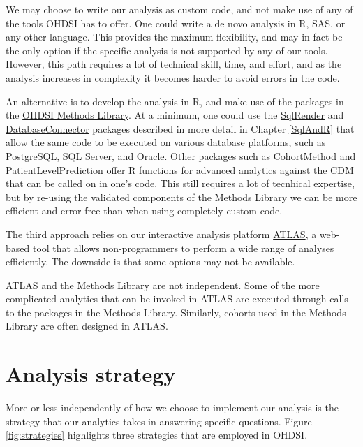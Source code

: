 \documentclass[11pt]{book}
\begin{document}
We may choose to write our analysis as custom code, and not make use of
any of the tools OHDSI has to offer. One could write a de novo analysis
in R, SAS, or any other language. This provides the maximum flexibility,
and may in fact be the only option if the specific analysis is not
supported by any of our tools. However, this path requires a lot of
technical skill, time, and effort, and as the analysis increases in
complexity it becomes harder to avoid errors in the code.

An alternative is to develop the analysis in R, and make use of the
packages in the \href{https://ohdsi.github.io/MethodsLibrary/}{OHDSI
Methods Library}. At a minimum, one could use the
\href{https://ohdsi.github.io/SqlRender/}{SqlRender} and
\href{https://ohdsi.github.io/DatabaseConnector/}{DatabaseConnector}
packages described in more detail in Chapter \ref{SqlAndR} that allow
the same code to be executed on various database platforms, such as
PostgreSQL, SQL Server, and Oracle. Other packages such as
\href{https://ohdsi.github.io/CohortMethod/}{CohortMethod} and
\href{https://ohdsi.github.io/PatientLevelPrediction/}{PatientLevelPrediction}
offer R functions for advanced analytics against the CDM that can be
called on in one's code. This still requires a lot of tecnhical
expertise, but by re-using the validated components of the Methods
Library we can be more efficient and error-free than when using
completely custom code.

The third approach relies on our interactive analysis platform
\href{https://github.com/OHDSI/Atlas/wiki}{ATLAS}, a web-based tool that
allows non-programmers to perform a wide range of analyses efficiently.
The downside is that some options may not be available.

ATLAS and the Methods Library are not independent. Some of the more
complicated analytics that can be invoked in ATLAS are executed through
calls to the packages in the Methods Library. Similarly, cohorts used in
the Methods Library are often designed in ATLAS.

\section{Analysis strategy}\label{analysis-strategy}

More or less independently of how we choose to implement our analysis is
the strategy that our analytics takes in answering specific questions.
Figure \ref{fig:strategies} highlights three strategies that are
employed in OHDSI.
\end{document}
